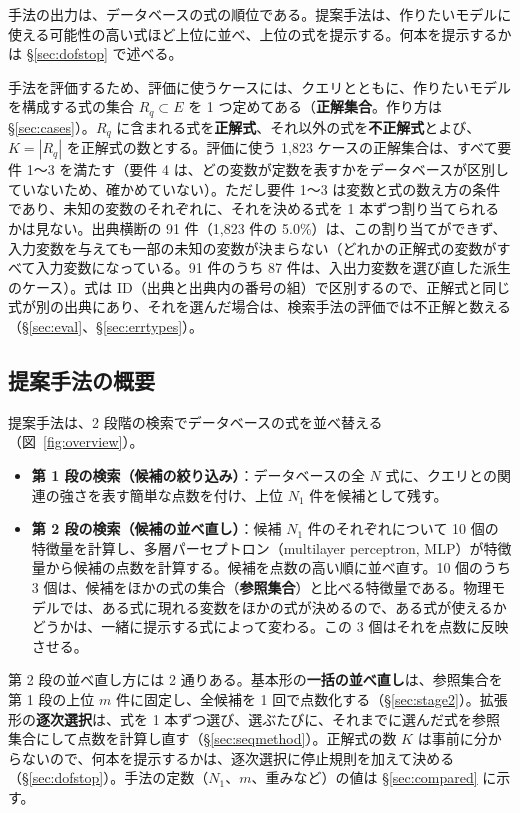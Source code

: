 \documentclass[a4j,dvipdfmx,11pt]{jresume}
\begin{document}
手法の出力は、データベースの式の順位である。提案手法は、作りたいモデルに使える可能性の高い式ほど上位に並べ、上位の式を提示する。何本を提示するかは \S\ref{sec:dofstop} で述べる。

手法を評価するため、評価に使うケースには、クエリとともに、作りたいモデルを構成する式の集合 $R_q \subset E$ を 1 つ定めてある（\textbf{正解集合}。作り方は \S\ref{sec:cases}）。$R_q$ に含まれる式を\textbf{正解式}、それ以外の式を\textbf{不正解式}とよび、$K = |R_q|$ を正解式の数とする。評価に使う 1{,}823 ケースの正解集合は、すべて要件 1〜3 を満たす（要件 4 は、どの変数が定数を表すかをデータベースが区別していないため、確かめていない）。ただし要件 1〜3 は変数と式の数え方の条件であり、未知の変数のそれぞれに、それを決める式を 1 本ずつ割り当てられるかは見ない。出典横断の 91 件（1{,}823 件の 5.0\%）は、この割り当てができず、入力変数を与えても一部の未知の変数が決まらない（どれかの正解式の変数がすべて入力変数になっている。91 件のうち 87 件は、入出力変数を選び直した派生のケース）。式は ID（出典と出典内の番号の組）で区別するので、正解式と同じ式が別の出典にあり、それを選んだ場合は、検索手法の評価では不正解と数える（\S\ref{sec:eval}、\S\ref{sec:errtypes}）。

\subsection{提案手法の概要}\label{sec:overview}
提案手法は、2 段階の検索でデータベースの式を並べ替える（図~\ref{fig:overview}）。
\begin{itemize}[leftmargin=1.5em]
  \item \textbf{第 1 段の検索（候補の絞り込み）}：データベースの全 $N$ 式に、クエリとの関連の強さを表す簡単な点数を付け、上位 $N_1$ 件を候補として残す。
  \item \textbf{第 2 段の検索（候補の並べ直し）}：候補 $N_1$ 件のそれぞれについて 10 個の特徴量を計算し、多層パーセプトロン（multilayer perceptron, MLP）が特徴量から候補の点数を計算する。候補を点数の高い順に並べ直す。10 個のうち 3 個は、候補をほかの式の集合（\textbf{参照集合}）と比べる特徴量である。物理モデルでは、ある式に現れる変数をほかの式が決めるので、ある式が使えるかどうかは、一緒に提示する式によって変わる。この 3 個はそれを点数に反映させる。
\end{itemize}
第 2 段の並べ直し方には 2 通りある。基本形の\textbf{一括の並べ直し}は、参照集合を第 1 段の上位 $m$ 件に固定し、全候補を 1 回で点数化する（\S\ref{sec:stage2}）。拡張形の\textbf{逐次選択}は、式を 1 本ずつ選び、選ぶたびに、それまでに選んだ式を参照集合にして点数を計算し直す（\S\ref{sec:seqmethod}）。正解式の数 $K$ は事前に分からないので、何本を提示するかは、逐次選択に停止規則を加えて決める（\S\ref{sec:dofstop}）。手法の定数（$N_1$、$m$、重みなど）の値は \S\ref{sec:compared} に示す。
\end{document}
